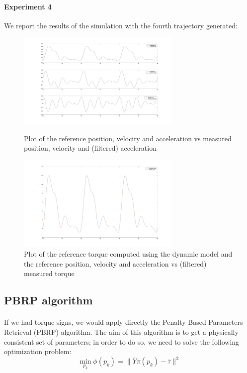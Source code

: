 \documentclass{article}
\begin{document}
\paragraph{Experiment 4}
We report the results of the simulation with the fourth trajectory generated:
\begin{figure}[!htbp]
\centering
\includegraphics[width=0.7\textwidth]{images/1-dof/experiment4_traj.png}
\caption{Plot of the reference position, velocity and acceleration vs measured position, velocity and (filtered) acceleration}
\includegraphics[width=0.7\textwidth]{images/1-dof/experiment4.png}
\caption{Plot of the reference torque computed using the dynamic model and the reference position, velocity and acceleration vs (filtered) measured torque}
\end{figure}
\pagebreak

\subsection{PBRP algorithm}
\paragraph{}If we had torque signs, we would apply directly the Penalty-Based Parameters Retrieval (PBRP) algorithm. The aim of this algorithm is to get a physically consistent set of parameters; in order to do so, we need to solve the following optimization problem:
\[\min_{p_k}{\phi(p_k)} = \lVert \overline{Y}\pi(p_k)-\overline{\tau} \rVert^2\]
\end{document}
